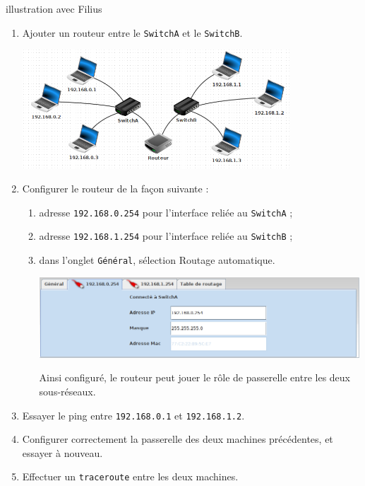 \documentclass[a4paper,dvipsnames]{article}
\begin{document}
\medskip

\begin{activite}[breakable]{illustration avec Filius}{}
  \begin{enumerate}
    \item Ajouter un routeur entre le \texttt{SwitchA} et le \texttt{SwitchB}.
      \begin{center}
	\includegraphics[width=10cm]{img/f5.png}
      \end{center}
    \item Configurer le routeur de la façon suivante :
      \begin{enumerate}
	\item adresse \texttt{192.168.0.254} pour l'interface reliée au \texttt{SwitchA} ;
	\item adresse \texttt{192.168.1.254} pour l'interface reliée au \texttt{SwitchB} ;
	\item dans l'onglet \verb|Général|, sélection \og{}Routage automatique\fg{}.
	  \begin{center}
	    \includegraphics[width=12cm]{img/flsrouteur.png}
	\end{center}
	Ainsi configuré, le routeur peut jouer le rôle de passerelle entre les deux sous-réseaux.
    \end{enumerate}
  \item Essayer le ping entre \texttt{192.168.0.1} et \texttt{192.168.1.2}.
  \item Configurer correctement la passerelle des deux machines précédentes, et essayer à nouveau.
  \item Effectuer un \texttt{traceroute} entre les deux machines.
  \end{enumerate}
\end{activite}
\end{document}
